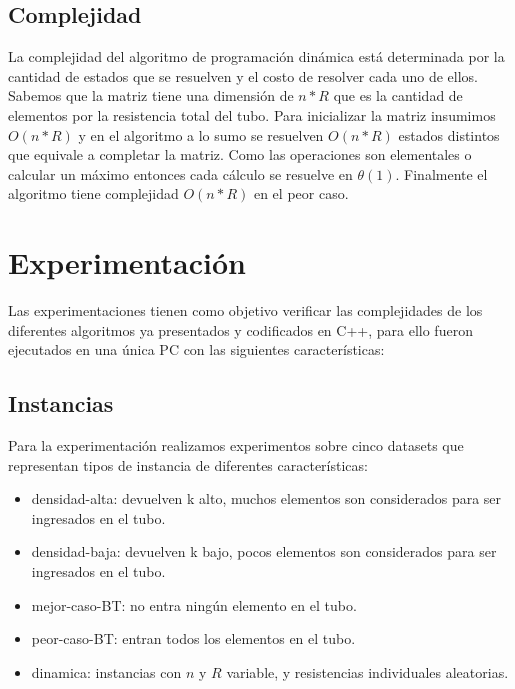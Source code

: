 \documentclass[10pt,a4paper]{article}
\begin{document}
\subsection{Complejidad}
La complejidad del algoritmo de programación dinámica está determinada por la cantidad de estados que se resuelven y el costo de resolver cada uno de ellos.
Sabemos que la matriz tiene una dimensión de $n * R$ que es la cantidad de elementos por la resistencia total del tubo. Para inicializar la matriz insumimos $O(n * R)$ y en el algoritmo a lo sumo se resuelven $O(n * R)$ estados distintos que equivale a completar la matriz. Como las operaciones son elementales o calcular un máximo entonces cada cálculo se resuelve en $\theta(1)$. Finalmente el algoritmo tiene complejidad $O(n * R)$ en el peor caso.

\section{Experimentación} \label{sec:experimentacion}
Las experimentaciones tienen como objetivo verificar las complejidades de los diferentes algoritmos ya presentados y codificados en C++, para ello fueron ejecutados en una única PC con las siguientes características:

\subsection{Instancias}
Para la experimentación realizamos experimentos sobre cinco datasets que representan tipos de instancia de diferentes características:
\begin{itemize}
	\item densidad-alta: devuelven k alto, muchos elementos son considerados para ser ingresados en el tubo.
	\item densidad-baja: devuelven k bajo, pocos elementos son considerados para ser ingresados en el tubo.
	\item mejor-caso-BT: no entra ningún elemento en el tubo.
	\item peor-caso-BT: entran todos los elementos en el tubo.
	\item dinamica: instancias con $n$ y $R$ variable, y resistencias individuales aleatorias.
\end{itemize}
\end{document}
